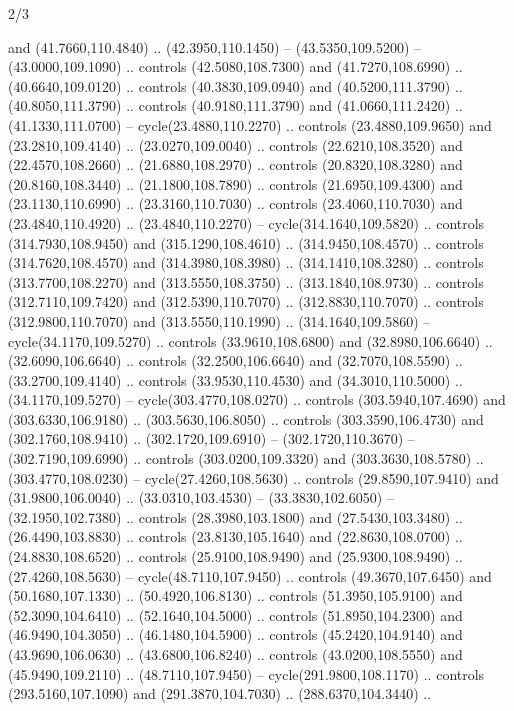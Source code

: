 \begin{flagdescription}{2/3}
\begin{scope}[xshift=0.5\flaglength,yshift=0.5\flagwidth,scale=\stretchfactor]
\begin{scope}[scale=0.001645\flagwidth,yshift=65mm,xshift=-63mm]
\begin{scope}[y=0.80pt, x=0.80pt, yscale=-1,]
\begin{scope}[cm={{1.33333,0.0,0.0,1.33333,(0.0,1e-05)}}]
  and (41.7660,110.4840) .. (42.3950,110.1450) -- (43.5350,109.5200) --
  (43.0000,109.1090) .. controls (42.5080,108.7300) and (41.7270,108.6990) ..
  (40.6640,109.0120) .. controls (40.3830,109.0940) and (40.5200,111.3790) ..
  (40.8050,111.3790) .. controls (40.9180,111.3790) and (41.0660,111.2420) ..
  (41.1330,111.0700) -- cycle(23.4880,110.2270) .. controls (23.4880,109.9650)
  and (23.2810,109.4140) .. (23.0270,109.0040) .. controls (22.6210,108.3520)
  and (22.4570,108.2660) .. (21.6880,108.2970) .. controls (20.8320,108.3280)
  and (20.8160,108.3440) .. (21.1800,108.7890) .. controls (21.6950,109.4300)
  and (23.1130,110.6990) .. (23.3160,110.7030) .. controls (23.4060,110.7030)
  and (23.4840,110.4920) .. (23.4840,110.2270) -- cycle(314.1640,109.5820) ..
  controls (314.7930,108.9450) and (315.1290,108.4610) .. (314.9450,108.4570) ..
  controls (314.7620,108.4570) and (314.3980,108.3980) .. (314.1410,108.3280) ..
  controls (313.7700,108.2270) and (313.5550,108.3750) .. (313.1840,108.9730) ..
  controls (312.7110,109.7420) and (312.5390,110.7070) .. (312.8830,110.7070) ..
  controls (312.9800,110.7070) and (313.5550,110.1990) .. (314.1640,109.5860) --
  cycle(34.1170,109.5270) .. controls (33.9610,108.6800) and (32.8980,106.6640)
  .. (32.6090,106.6640) .. controls (32.2500,106.6640) and (32.7070,108.5590) ..
  (33.2700,109.4140) .. controls (33.9530,110.4530) and (34.3010,110.5000) ..
  (34.1170,109.5270) -- cycle(303.4770,108.0270) .. controls (303.5940,107.4690)
  and (303.6330,106.9180) .. (303.5630,106.8050) .. controls (303.3590,106.4730)
  and (302.1760,108.9410) .. (302.1720,109.6910) -- (302.1720,110.3670) --
  (302.7190,109.6990) .. controls (303.0200,109.3320) and (303.3630,108.5780) ..
  (303.4770,108.0230) -- cycle(27.4260,108.5630) .. controls (29.8590,107.9410)
  and (31.9800,106.0040) .. (33.0310,103.4530) -- (33.3830,102.6050) --
  (32.1950,102.7380) .. controls (28.3980,103.1800) and (27.5430,103.3480) ..
  (26.4490,103.8830) .. controls (23.8130,105.1640) and (22.8630,108.0700) ..
  (24.8830,108.6520) .. controls (25.9100,108.9490) and (25.9300,108.9490) ..
  (27.4260,108.5630) -- cycle(48.7110,107.9450) .. controls (49.3670,107.6450)
  and (50.1680,107.1330) .. (50.4920,106.8130) .. controls (51.3950,105.9100)
  and (52.3090,104.6410) .. (52.1640,104.5000) .. controls (51.8950,104.2300)
  and (46.9490,104.3050) .. (46.1480,104.5900) .. controls (45.2420,104.9140)
  and (43.9690,106.0630) .. (43.6800,106.8240) .. controls (43.0200,108.5550)
  and (45.9490,109.2110) .. (48.7110,107.9450) -- cycle(291.9800,108.1170) ..
  controls (293.5160,107.1090) and (291.3870,104.7030) .. (288.6370,104.3440) ..

\end{scope}
\end{scope}
\end{scope}
\end{scope}
\end{flagdescription}
